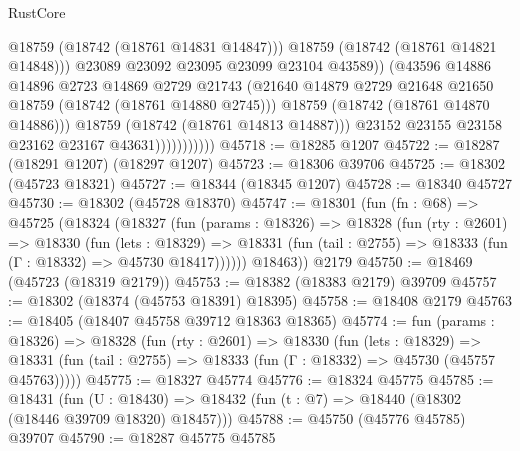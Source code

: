 \begin{lexlean}{RustCore}
\begin{coremodule}
                                    @18759
                                    (@18742 (@18761 @14831 @14847)))
                                  @18759
                                  (@18742 (@18761 @14821 @14848)))
                                @23089
                                @23092
                                @23095
                                @23099
                                @23104
                                @43589))
                            (@43596
                              @14886
                              @14896
                              @2723
                              @14869
                              @2729
                              @21743
                              (@21640
                                @14879
                                @2729
                                @21648
                                @21650
                                @18759
                                (@18742 (@18761 @14880 @2745)))
                              @18759
                              (@18742 (@18761 @14870 @14886)))
                            @18759
                            (@18742 (@18761 @14813 @14887)))
                          @23152
                          @23155
                          @23158
                          @23162
                          @23167
                          @43631)))))))))))
@45718 := @18285 @1207
@45722 := @18287 (@18291 @1207) (@18297 @1207)
@45723 := @18306 @39706
@45725 := @18302 (@45723 @18321)
@45727 := @18344 (@18345 @1207)
@45728 := @18340 @45727
@45730 := @18302 (@45728 @18370)
@45747 := @18301
    (fun (fn : @68) =>
    @45725
      (@18324
        (@18327
          (fun (params : @18326) =>
          @18328
            (fun (rty : @2601) =>
            @18330
              (fun (lets : @18329) =>
              @18331 (fun (tail : @2755) => @18333 (fun (Γ : @18332) => @45730 @18417))))))
        @18463))
    @2179
@45750 := @18469 (@45723 (@18319 @2179))
@45753 := @18382 (@18383 @2179) @39709
@45757 := @18302 (@18374 (@45753 @18391) @18395)
@45758 := @18408 @2179
@45763 := @18405 (@18407 @45758 @39712 @18363 @18365)
@45774 := fun (params : @18326) =>
  @18328
    (fun (rty : @2601) =>
    @18330
      (fun (lets : @18329) =>
      @18331 (fun (tail : @2755) => @18333 (fun (Γ : @18332) => @45730 (@45757 @45763)))))
@45775 := @18327 @45774
@45776 := @18324 @45775
@45785 := @18431
    (fun (U : @18430) => @18432 (fun (t : @7) => @18440 (@18302 (@18446 @39709 @18320) @18457)))
@45788 := @45750 (@45776 @45785) @39707
@45790 := @18287 @45775 @45785

\end{coremodule}
\end{lexlean}
